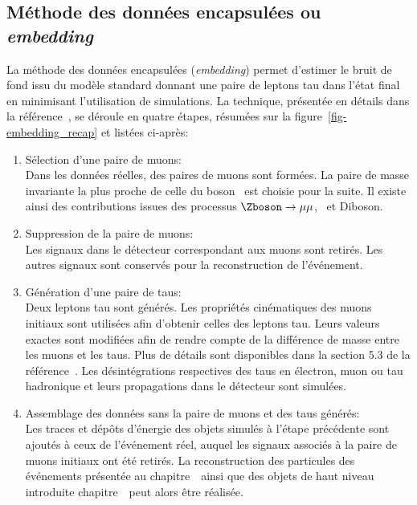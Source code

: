 \subsection{Méthode des données encapsulées ou \emph{embedding}}\label{chapter-HTT_analysis-section-bg_estimation-embedding}
La méthode des données encapsulées (\emph{embedding}) permet d'estimer le bruit de fond issu du modèle standard donnant une paire de leptons tau dans l'état final en minimisant l'utilisation de simulations.
La technique, présentée en détails dans la référence~\cite{embedding}, se déroule en quatre étapes, résumées sur la figure~\ref{fig-embedding_recap} et listées ci-après:
\begin{enumerate}
\item Sélection d'une paire de muons:\\
Dans les données réelles, des paires de muons sont formées.
La paire de masse invariante la plus proche de celle du boson \Zboson\ est choisie pour la suite.
Il existe ainsi des contributions issues des processus $\Zboson\to\mu\mu$, \ttbar\ et Diboson.
\item Suppression de la paire de muons:\\
Les signaux dans le détecteur correspondant aux muons sont retirés.
Les autres signaux sont conservés pour la reconstruction de l'événement.
\item Génération d'une paire de taus:\\
Deux leptons tau sont générés.
Les propriétés cinématiques des muons initiaux sont utilisées afin d'obtenir celles des leptons tau.
Leurs valeurs exactes sont modifiées afin de rendre compte de la différence de masse entre les muons et les taus.
Plus de détails sont disponibles dans la section 5.3 de la référence~\cite{embedding}.
Les désintégrations respectives des taus en électron, muon ou tau hadronique et leurs propagations dans le détecteur sont simulées.
\item Assemblage des données sans la paire de muons et des taus générés:\\
Les traces et dépôts d'énergie des objets simulés à l'étape précédente sont ajoutés à ceux de l'événement réel, auquel les signaux associés à la paire de muons initiaux ont été retirés.
La reconstruction des particules des événements présentée au chapitre~\ ainsi que des objets de haut niveau introduite chapitre~\ peut alors être réalisée.
\end{enumerate}
